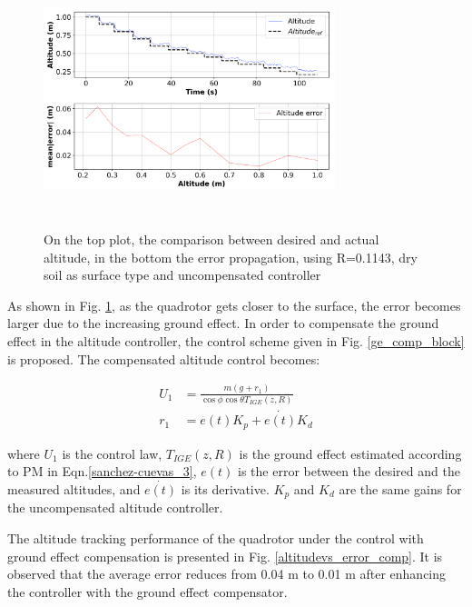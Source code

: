 \documentclass[twocolumn,10pt]{asme2ej}
\begin{document}
\begin{figure}[t]
  \begin{center}
  \setlength{\unitlength}{0.012500in}%
  \includegraphics[width=8.5cm,height=7.5cm]{Images/alt_ref_error_subplot.png}
  \end{center}
  \caption{On the top plot, the comparison between desired and actual altitude, in the bottom the error propagation, using R=0.1143, dry soil as surface type and uncompensated controller}
  \label{altitudevs_error}
\end{figure}

As shown in Fig. \ref{altitudevs_error}, as the quadrotor gets closer to the surface, the error becomes larger due to the increasing ground effect. In order to compensate the ground effect in the altitude controller, the control scheme given in Fig. \ref{ge_comp_block} is proposed. The compensated altitude control becomes:

\begin{align}
  U_{1} &= \frac{m(g+r_{1})}{\cos\phi\cos\theta T_{IGE}(z,R)} \\
  r_{1} &= e(t)K_{p} + \dot{e(t)}K_{d} 
\end{align}

\noindent where $U_{1}$ is the control law, $T_{IGE}(z,R)$ is the ground effect estimated according to PM in Eqn.\eqref{sanchez-cuevas_3}, $e(t)$ is the error between the desired and the measured altitudes, and $\dot{e(t)}$ is its derivative. $K_{p}$ and $K_{d}$ are the same gains for the uncompensated altitude controller.

The altitude tracking performance of the quadrotor under the control with ground effect compensation is presented in Fig. \ref{altitudevs_error_comp}. It is observed that the average error reduces from 0.04 m  to 0.01 m after enhancing the controller with  the ground effect compensator.
\end{document}
